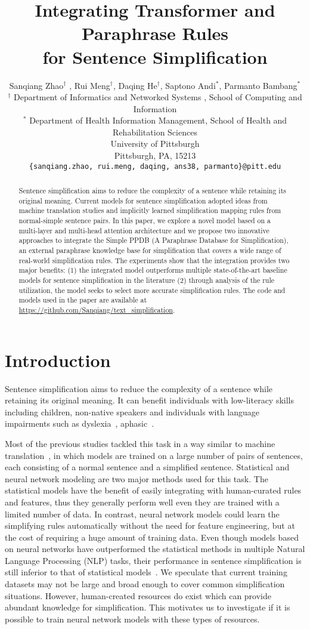\documentclass[11pt,a4paper]{article}
\title{Integrating Transformer and Paraphrase Rules \\ for Sentence Simplification}
\author{Sanqiang Zhao$^{\dagger}$
, Rui Meng$^{\dagger}$, Daqing He$^{\dagger}$, Saptono Andi$^{*}$, Parmanto Bambang$^{*}$ \\
  $^{\dagger}$ Department of Informatics and Networked Systems
, School of Computing and Information  \\
  $^{*}$ Department of Health Information Management, School of Health and Rehabilitation Sciences \\
  University of Pittsburgh \\
  Pittsburgh, PA, 15213 \\
  {\tt \{sanqiang.zhao, rui.meng, daqing, ans38, parmanto\}@pitt.edu} 
\\}
\date{}
\begin{document}
\maketitle
\begin{abstract}
Sentence simplification aims to reduce the complexity of a sentence while retaining its original meaning. Current models for sentence simplification adopted ideas from machine translation studies and implicitly learned simplification mapping rules from normal-simple sentence pairs. In this paper, we explore a novel model based on a multi-layer and multi-head attention architecture and we propose two innovative approaches to integrate the Simple PPDB (A Paraphrase Database for Simplification), an external paraphrase knowledge base for simplification that covers a wide range of real-world simplification rules. The experiments show that the integration provides two major benefits: (1) the integrated model outperforms multiple state-of-the-art baseline models for sentence simplification in the literature (2) through analysis of the rule utilization, the model seeks to select more accurate simplification rules. The code and models used in the paper are available at \url{https://github.com/Sanqiang/text_simplification}.
  
\end{abstract}

\section{Introduction}

Sentence simplification aims to reduce the complexity of a sentence while retaining its original meaning. It can benefit individuals with low-literacy skills ~\cite{watanabe2009facilita} including children, non-native speakers and individuals with language impairments such as dyslexia~\cite{rello2013dyswebxia}, aphasic~\cite{carroll1999simplifying}.

Most of the previous studies tackled this task in a way similar to machine translation~\cite{xu2015show, zhang2017sentence}, in which models are trained on a large number of pairs of sentences, each consisting of a normal sentence and a simplified sentence. Statistical and neural network modeling are two major methods used for this task. The statistical models have the benefit of easily integrating with human-curated rules and features, thus they generally perform well even they are trained with a limited number of data. In contrast, neural network models could learn the simplifying rules automatically without the need for feature engineering, but at the cost of requiring a huge amount of training data. Even though models based on neural networks have outperformed the statistical methods in multiple Natural Language Processing (NLP) tasks, their performance in sentence simplification is still inferior to that of statistical models~\cite{xu2015show, zhang2017sentence}. We speculate that current training datasets may not be large and broad enough to cover common simplification situations. However, human-created resources do exist which can provide abundant knowledge for simplification. This motivates us to investigate if it is possible to train neural network models with these types of resources.
\end{document}
